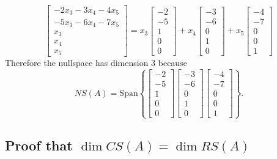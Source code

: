 \documentclass[10pt]{article}
\theoremstyle{definition}
\newcommand{\Span}{\mathrm{Span}} %
\begin{document}
\begin{equation*}
  \begin{bmatrix}
    -2x_{3}-3x_{4}-4x_{5}\\
    -5x_{3}-6x_{4}-7x_{5}\\
    x_{3}\\
    x_{4}\\
    x_{5}
  \end{bmatrix}
  =
  x_{3}
  \begin{bmatrix}
    -2\\-5\\1\\0\\0
  \end{bmatrix}
  +
  x_{4}
  \begin{bmatrix}
    -3\\-6\\0\\1\\0
  \end{bmatrix}
  +
  x_{5}
  \begin{bmatrix}
    -4\\-7\\0\\0\\1
  \end{bmatrix}
\end{equation*}
Therefore the nullspace has dimension 3 because
\begin{equation*}
  NS(A) = \Span \left\{
    \begin{bmatrix}
      -2\\-5\\1\\0\\0
    \end{bmatrix}
    \begin{bmatrix}
      -3\\-6\\0\\1\\0
    \end{bmatrix}
    \begin{bmatrix}
      -4\\-7\\0\\0\\1
    \end{bmatrix}
  \right\}.
\end{equation*}

\subsection{Proof that $\dim CS(A)=\dim RS(A)$}
\end{document}
